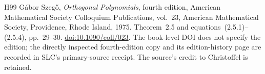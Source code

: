 \documentclass[11pt,a4paper]{article}
\begin{document}
\begin{thebibliography}{H99}
G\'abor Szeg\H{o}, \emph{Orthogonal Polynomials},
fourth edition, American Mathematical Society Colloquium Publications,
vol.~23, American Mathematical Society, Providence, Rhode Island, 1975.
Theorem~2.5 and equations~(2.5.1)--(2.5.4), pp.~29--30.
\href{https://doi.org/10.1090/coll/023}{doi:10.1090/coll/023}.
The book-level DOI does not specify the edition; the directly inspected
fourth-edition copy and its edition-history page are recorded in SLC's
primary-source receipt. The source's credit to Christoffel is retained.


\end{thebibliography}
\end{document}
